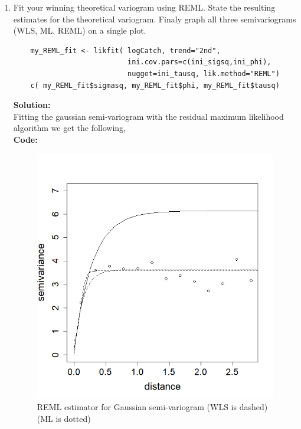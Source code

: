 \documentclass[12pt]{article}
\makeatletter
\theoremstyle{homework}
\newenvironment{exercise}[1]
{\def\@currentlabel{#1}\exercisecore}
{\endexercisecore}
\newcommand{\localhead}[1]{\par\smallskip\noindent\textbf{#1}\nobreak\\}%
\newcommand\solution{\localhead{Solution:}}
\makeatother
\begin{document}
\begin{exercise}{4}
\begin{enumerate}
  \item Fit your winning theoretical variogram
  using REML.  State the resulting estimates for the theoretical variogram. Finaly graph all three semivariograms (WLS, ML, REML) on a single plot.
  \begin{verbatim}
    my_REML_fit <- likfit( logCatch, trend="2nd",
                           ini.cov.pars=c(ini_sigsq,ini_phi),
                           nugget=ini_tausq, lik.method="REML")
    c( my_REML_fit$sigmasq, my_REML_fit$phi, my_REML_fit$tausq)
  \end{verbatim}
  \solution  Fitting the gaussian semi-variogram with the residual maximum likelihood algorithm we get the following, \\
  \textbf{Code:}
  \begin{center}
  
  \end{center}
  \begin{figure}[H]
    \begin{center}
      \caption{REML estimator for Gaussian semi-variogram (WLS is dashed)(ML is dotted)}
    \includegraphics[width = .70\textwidth]{Rplot08.png}
    \end{center}
  \end{figure}
  

  \end{enumerate}
\end{exercise}
\vspace{1in}
\end{document}
